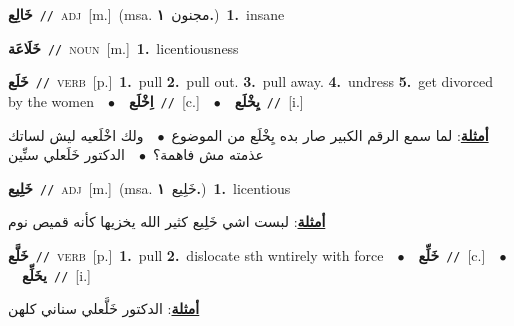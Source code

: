\documentclass[10pt,a4paper,twoside]{article} %
\begin{document}
\begin{multicols}{2}
{\setlength\topsep{0pt}\textbf{\foreignlanguage{arabic}{خَالِع}}\ {\color{gray}\texttt{//}\color{black}}\ \textsc{adj}\ [m.]\ \color{gray}(msa. \foreignlanguage{arabic}{مجنون}~\foreignlanguage{arabic}{\textbf{١.}})\color{black}\ \textbf{1.}~insane\ } \vspace{2mm}

{\setlength\topsep{0pt}\textbf{\foreignlanguage{arabic}{خَلَاعَة}}\ {\color{gray}\texttt{//}\color{black}}\ \textsc{noun}\ [m.]\ \textbf{1.}~licentiousness\ } \vspace{2mm}

{\setlength\topsep{0pt}\textbf{\foreignlanguage{arabic}{خَلَع}}\ {\color{gray}\texttt{//}\color{black}}\ \textsc{verb}\ [p.]\ \textbf{1.}~pull  \textbf{2.}~pull out.  \textbf{3.}~pull away.  \textbf{4.}~undress  \textbf{5.}~get divorced by the women\ \ $\bullet$\ \ \setlength\topsep{0pt}\textbf{\foreignlanguage{arabic}{اِخْلَع}}\ {\color{gray}\texttt{//}\color{black}}\ [c.]\ \ $\bullet$\ \ \setlength\topsep{0pt}\textbf{\foreignlanguage{arabic}{يِخْلَع}}\ {\color{gray}\texttt{//}\color{black}}\ [i.]\  \begin{flushright}\color{gray}\foreignlanguage{arabic}{\textbf{\underline{\foreignlanguage{arabic}{أمثلة}}}: لما سمع الرقم الكبير صار بده يِخْلَع من الموضوع\ $\bullet$\ \  ولك اخْلَعيه ليش لساتك عذمته مش فاهمة؟\ $\bullet$\ \  الدكتور خَلَعلي سنِّين}\end{flushright}\color{black}} \vspace{2mm}

{\setlength\topsep{0pt}\textbf{\foreignlanguage{arabic}{خَلِيع}}\ {\color{gray}\texttt{//}\color{black}}\ \textsc{adj}\ [m.]\ \color{gray}(msa. \foreignlanguage{arabic}{خَلِيع}~\foreignlanguage{arabic}{\textbf{١.}})\color{black}\ \textbf{1.}~licentious\  \begin{flushright}\color{gray}\foreignlanguage{arabic}{\textbf{\underline{\foreignlanguage{arabic}{أمثلة}}}: لبست اشي خَلِيع كثير الله يخزيها كأنه قميص نوم}\end{flushright}\color{black}} \vspace{2mm}

{\setlength\topsep{0pt}\textbf{\foreignlanguage{arabic}{خَلَّع}}\ {\color{gray}\texttt{//}\color{black}}\ \textsc{verb}\ [p.]\ \textbf{1.}~pull  \textbf{2.}~dislocate sth wntirely with force\ \ $\bullet$\ \ \setlength\topsep{0pt}\textbf{\foreignlanguage{arabic}{خَلِّع}}\ {\color{gray}\texttt{//}\color{black}}\ [c.]\ \ $\bullet$\ \ \setlength\topsep{0pt}\textbf{\foreignlanguage{arabic}{يخَلِّع}}\ {\color{gray}\texttt{//}\color{black}}\ [i.]\  \begin{flushright}\color{gray}\foreignlanguage{arabic}{\textbf{\underline{\foreignlanguage{arabic}{أمثلة}}}: الدكتور خَلَّعلي سناني كلهن}\end{flushright}\color{black}} \vspace{2mm}


\end{multicols}
\end{document}

